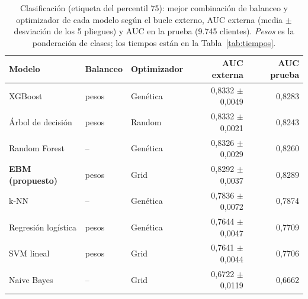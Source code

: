 \begin{table}[htbp]
\caption{Clasificación (etiqueta del percentil 75): mejor combinación de balanceo y optimizador de cada modelo según el bucle externo, AUC externa (media $\pm$ desviación de los 5 pliegues) y AUC en la prueba (9.745 clientes). \emph{Pesos} es la ponderación de clases; los tiempos están en la Tabla~\ref{tab:tiempos}.}\label{tab:clasificacion}
\scriptsize\setlength{\tabcolsep}{2pt}
\begin{tabular}{lllrr}
\toprule
\textbf{Modelo} & \textbf{Balanceo} & \textbf{Optimizador} & \textbf{AUC externa} & \textbf{AUC prueba} \\
\midrule
XGBoost & pesos & Genética & 0,8332 $\pm$ 0,0049 & 0,8283 \\
Árbol de decisión & pesos & Random & 0,8332 $\pm$ 0,0021 & 0,8243 \\
Random Forest & -- & Genética & 0,8326 $\pm$ 0,0029 & 0,8260 \\
\textbf{EBM (propuesto)} & pesos & Grid & 0,8292 $\pm$ 0,0037 & 0,8289 \\
k-NN & -- & Genética & 0,7836 $\pm$ 0,0072 & 0,7874 \\
Regresión logística & pesos & Genética & 0,7644 $\pm$ 0,0047 & 0,7709 \\
SVM lineal & pesos & Grid & 0,7641 $\pm$ 0,0044 & 0,7706 \\
Naive Bayes & -- & Grid & 0,6722 $\pm$ 0,0119 & 0,6662 \\
\bottomrule
\end{tabular}
\end{table}
